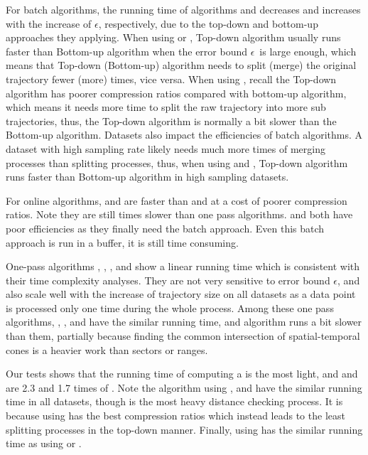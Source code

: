For batch algorithms, the running time of algorithms \dpa and \tpa decreases and increases with the increase of $\epsilon$, respectively, due to the top-down and bottom-up approaches they applying. When using \ped or \sed, Top-down algorithm usually runs faster than Bottom-up algorithm when the error bound $\epsilon$~is large enough, which means that Top-down (Bottom-up) algorithm needs to split (merge) the original trajectory fewer (more) times, vice versa. When using \dad, recall the Top-down algorithm has poorer compression ratios compared with bottom-up algorithm, which means it needs more time to split the raw trajectory into more sub trajectories, thus, the Top-down algorithm is normally a bit slower than the Bottom-up algorithm.
Datasets also impact the efficiencies of batch algorithms. A dataset with high sampling rate likely needs much more times of merging processes than splitting processes, thus, when using \ped and \sed, Top-down algorithm runs faster than Bottom-up algorithm in high sampling datasets.

For online algorithms, \fbqsa and \squishe are faster than \bqsa and \opwa at a cost of poorer compression ratios. Note they are still times slower than one pass algorithms. \bqsa and \opwa both have poor efficiencies as they finally need the batch approach. Even this batch approach is run in a buffer, it is still time consuming.

One-pass algorithms \operb, \siped, \operb, \cised and \interval show a linear running time which is consistent with their time complexity analyses. They are not very sensitive to error bound $\epsilon$, and also scale well with the increase of trajectory size on all datasets as a data point is processed only one time during the whole process.
Among these one pass algorithms, \operb, \siped, \operb and \interval have the similar running time, and algorithm \cised runs a bit slower than them, partially because finding the common intersection of spatial-temporal cones is a heavier work than sectors or ranges.


Our tests shows that the running time of computing a \dad is the most light, and \ped and \sed are 2.3 and 1.7 times of \dad.
{Note the algorithm \dpa using \ped, \sed and \dad have the similar running time in all datasets, though \ped is the most heavy distance checking process. It is because \dpa using \ped has the best compression ratios which instead leads to the least splitting processes in the top-down manner. Finally, \dpa using \ped has the similar running time as \dpa using \dad or \sed.}

